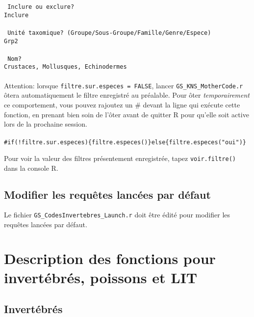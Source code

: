 \documentclass{article}
\begin{document}
\texttt{\color{MidnightBlue} Inclure ou exclure? } \\
\indent \indent \texttt{Inclure } \\
\\
\indent \texttt{\color{MidnightBlue} Unité taxomique? (Groupe/Sous-Groupe/Famille/Genre/Espece)} \\
\indent \indent \texttt{Grp2}\\
\\
\indent \texttt{\color{MidnightBlue} Nom?} \\
\indent \indent \texttt{Crustaces, Mollusques, Echinodermes}\\
\\

\noindent Attention: lorsque \texttt{filtre.sur.especes =
  FALSE}, lancer \texttt{GS\_KNS\_MotherCode.r} ôtera automatiquement
le filtre enregistré au préalable. Pour ôter \emph{temporairement} ce comportement,
vous pouvez rajoutez un \# devant la ligne qui exécute cette fonction,
en prenant bien soin de l'ôter avant de quitter R pour qu'elle soit
active lors de la prochaine session. \\
\\
\texttt{\#if(!filtre.sur.especes)\{filtre.especes()\}else\{filtre.especes("oui")\}}

Pour voir la valeur des filtres présentement enregistrée, tapez
\texttt{voir.filtre()} dans la console R.

\subsection*{Modifier les requêtes lancées par défaut}
Le fichier \texttt{GS\_CodesInvertebres\_Launch.r} doit être édité
pour modifier les requêtes lancées par défaut.


\section{Description des fonctions pour invertébrés, poissons et LIT}
\subsection{Invertébrés}
\end{document}
